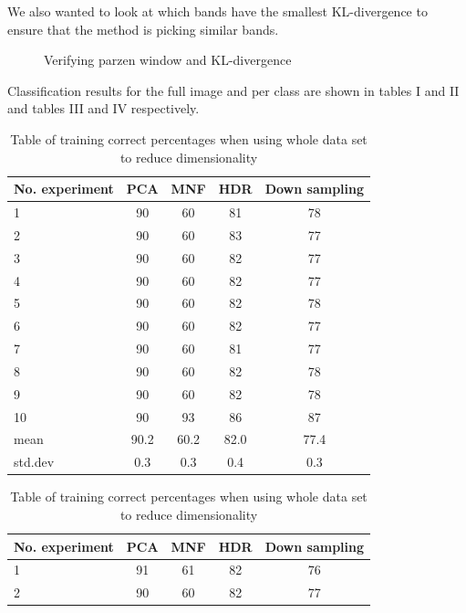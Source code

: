 \documentclass[conference,onecolumn]{IEEEtran}
\begin{document}
We also wanted to look at which bands have the smallest KL-divergence to ensure that the method is picking similar bands.

\begin{figure}[H]
	\centering
	\qquad
	\caption{Verifying parzen window and KL-divergence}
\end{figure}

Classification results for the full image and per class are shown in tables I and II and tables III and IV respectively.
\begin{table}[!htb]
	\begin{minipage}{.4\linewidth}
		\centering
		\begin{tabular}{lcccc}
			\hline
			No. experiment & PCA & MNF & HDR & Down sampling\\
			\hline
			1 &  90 &  60 & 81 & 78 \\
			2 &  90 &  60 & 83 & 77 \\
			3 &  90 &  60 & 82 & 77 \\
			4 &  90 &  60 & 82 & 77 \\
			5 &  90 &  60 & 82 & 78 \\
			6 &  90 &  60 & 82 & 77 \\
			7 &  90 &  60 & 81 & 77 \\
			8 &  90 &  60 & 82 & 78 \\
			9 &  90 &  60 & 82 & 78 \\
			10 &  90 &  93 & 86 & 87 \\
			\hline
			mean & 90.2 & 60.2 & 82.0 & 77.4 \\
			std.dev & 0.3 & 0.3 & 0.4 & 0.3\\
			\hline
		\end{tabular}
		\caption{Table of training correct percentages when using whole data set to reduce dimensionality}
	\end{minipage}
	\qquad
	\qquad
	\qquad
	\qquad
	\begin{minipage}{.4\linewidth}
		\begin{tabular}{lcccc}
			\hline
			No. experiment & PCA & MNF & HDR & Down sampling\\
			\hline
			1 &  91 &  61 & 82 & 76 \\
			2 &  90 &  60 & 82 & 77 \\

\end{tabular}
\end{minipage}
\end{table}
\end{document}

